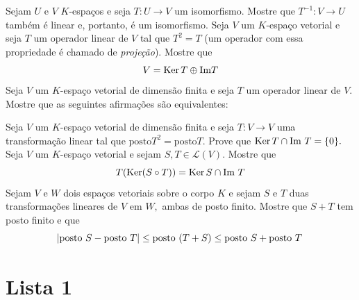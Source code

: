 \documentclass[11pt,a4paper]{article}
\begin{document}
\solucao{}
 Sejam $U$ e $V$ $K$-espaços e seja $T \colon U \to V$ um isomorfismo. Mostre que $T^{-1} \colon V \to U$ também é linear e, portanto, é um isomorfismo.
\solucao{}
 Seja $V$ um $K$-espaço vetorial e seja $T$ um operador linear de $V$ tal que $T^2 = T$ (um operador
com essa propriedade é chamado de \emph{projeção}). Mostre que \[V = \operatorname{Ker} T \oplus \mbox{Im} T\]
\solucao{}
 Seja $V$ um $K$-espaço vetorial de dimensão finita e seja $T$ um operador linear de $V.$ Mostre que as seguintes afirmações são equivalentes:

\solucao{%
}
 Seja $V$ um $K$-espaço vetorial de dimensão finita e seja $T \colon V \to V$ uma transformação linear tal que $\mbox{posto} T^2 = \mbox{posto} T.$ Prove que $\operatorname{Ker} T \cap \mbox{Im } T = \{0\}.$
\solucao{}
 Seja $V$ um $K$-espaço vetorial e sejam $S, T \in \mathcal{L}(V).$ Mostre que
\[
T(\operatorname{Ker}(S \circ T)) = \operatorname{Ker} S \cap \mbox{Im } T
\]
\solucao{}
 Sejam $V$ e $W$ dois espaços vetoriais sobre o corpo $K$ e sejam $S$ e $T$ duas transformações lineares de $V$ em $W,$ ambas de posto finito. Mostre que $S + T$ tem posto finito e que
\[
\abs{\mbox{posto } S - \mbox{posto } T} \le \mbox{posto }(T + S) \le \mbox{posto } S + \mbox{posto } T
\]
\solucao{}
\newpage
\section{\textcolor{Floresta}{Lista 1}}
\end{document}
